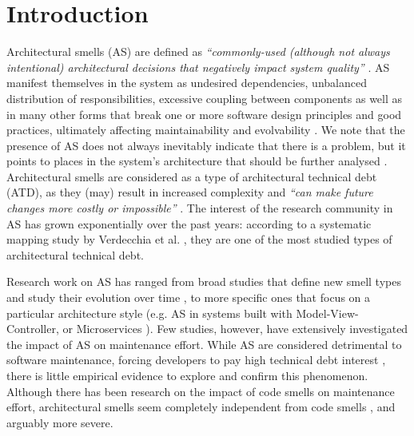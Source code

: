 \section{Introduction}\label{c5:sec:introduction}
Architectural smells (AS) are defined as \emph{``commonly-used (although not always intentional) architectural decisions that negatively impact system quality''} \cite{Garcia2009}.
AS manifest themselves in the system as undesired dependencies, unbalanced distribution of responsibilities, excessive coupling between components as well as in many other forms that break one or more software design principles and good practices, ultimately affecting maintainability and evolvability \cite{Lippert2006}.
We note that the presence of AS does not always inevitably indicate that there is a problem, but it points to places in the system’s architecture that should be further analysed \cite{Lippert2006}.
Architectural smells are considered as a type of architectural technical debt (ATD), as they (may) result in increased complexity and \emph{``can make future changes more costly or impossible''} \cite{Avgeriou2016}.
The interest of the research community in AS has grown exponentially over the past years: according to a systematic mapping study by Verdecchia et al. \cite{Verdecchia2018}, they are one of the most studied types of architectural technical debt.

Research work on AS has ranged from broad studies that define new smell types and study their evolution over time \cite{Arcelli2016,Oyetoyan2015,Le2015}, to more specific ones that focus on a particular architecture style (e.g. AS in systems built with Model-View-Controller, or Microservices \cite{Neri2019}).
Few studies, however, have extensively investigated the impact of AS on maintenance effort. While AS are considered detrimental to software maintenance, forcing developers to pay high technical debt interest \cite{Garcia2009}, there is little empirical evidence to explore and confirm this phenomenon.
Although there has been research on the impact of code smells on maintenance effort, architectural smells seem completely independent from code smells \cite{Arcelli2019}, and arguably more severe. 

